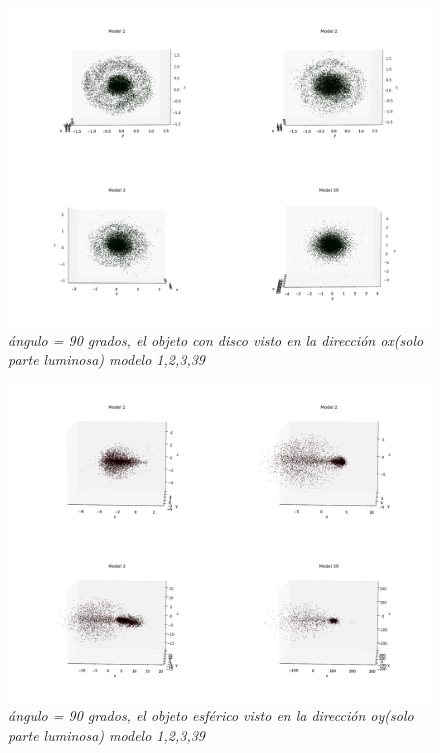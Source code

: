 \documentclass[12pt]{article} %
\renewcommand{\=}[1]{\stackrel{#1}{=}} %
\theoremstyle{definition}
\theoremstyle{remark}
\begin{document}
\begin{figure}[!ht]
 \centering
 \includegraphics[scale=0.2]{90deg-m-c2.png}
 \caption{\emph{ ángulo = 90 grados, el objeto con disco visto en la dirección ox(solo parte luminosa) modelo 1,2,3,39 }}
\end{figure}

\begin{figure}[!ht]
 \centering
 \includegraphics[scale=0.2]{sep590deg-2oy.png}
 \caption{\emph{ ángulo = 90 grados, el objeto esférico visto en la dirección oy(solo parte luminosa) modelo 1,2,3,39 }}
\end{figure}
\end{document}
